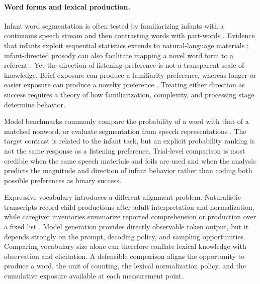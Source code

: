 \paragraph{Word forms and lexical production.}
Infant word segmentation is often tested by familiarizing infants with a continuous speech stream and then contrasting words with part-words \citep{saffran1996statistical,Aslin1998}. Evidence that infants exploit sequential statistics extends to natural-language materials \citep{Pelucchi2009}; infant-directed prosody can also facilitate mapping a novel word form to a referent \citep{grafestes2013prosody}. Yet the direction of listening preference is not a transparent scale of knowledge. Brief exposure can produce a familiarity preference, whereas longer or easier exposure can produce a novelty preference \citep{hunter1988multifactor,houston2004distinguishing}. Treating either direction as success requires a theory of how familiarization, complexity, and processing stage determine behavior.

Model benchmarks commonly compare the probability of a word with that of a matched nonword, or evaluate segmentation from speech representations \citep{nguyen2022word,dunbar2021zero}. The target contrast is related to the infant task, but an explicit probability ranking is not the same response as a listening preference. Trial-level comparison is most credible when the same speech materials and foils are used and when the analysis predicts the magnitude and direction of infant behavior rather than coding both possible preferences as binary success.

Expressive vocabulary introduces a different alignment problem. Naturalistic transcripts record child productions after adult interpretation and normalization, while caregiver inventories summarize reported comprehension or production over a fixed list \citep{macwhinney_childes_2000,fenson1994variability}. Model generation provides directly observable token output, but it depends strongly on the prompt, decoding policy, and sampling opportunities. Comparing vocabulary size alone can therefore conflate lexical knowledge with observation and elicitation. A defensible comparison aligns the opportunity to produce a word, the unit of counting, the lexical normalization policy, and the cumulative exposure available at each measurement point.

